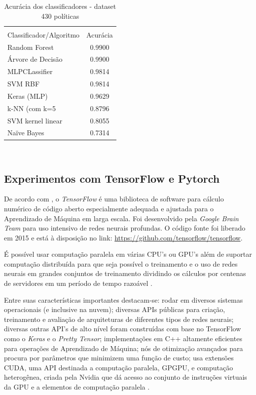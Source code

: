 \begin{table}[h]
	\centering
	\caption{Acurácia dos classificadores - dataset 430 políticas}
	\label{tab:acuracias2}
	\vspace{0.3cm}
	\begin{tabular}{p{6cm}c}
		\hline\\
		Classificador/Algoritmo& Acurácia  \\[10pt] 
		\hline
		Random Forest~		   & 0.9900    \\
		Árvore de Decisão      & 0.9900    \\
		MLPCLassifier~		   & 0.9814   \\
		SVM RBF                & 0.9814    \\
		Keras (MLP)            & 0.9629    \\
		k-NN (com k=5          & 0.8796    \\
		SVM kernel linear~	   & 0.8055    \\
		Naïve Bayes~		   & 0.7314    \\		
		\hline
	\end{tabular}
	\\[6pt]		
\end{table}

\subsection{Experimentos com TensorFlow e Pytorch}\label{exp:tensorflow-pytorch}
De acordo com , o \textit{TensorFlow} é uma biblioteca de software para cálculo numérico de código aberto especialmente adequada e ajustada para o Aprendizado de Máquina em larga escala. Foi desenvolvido pela \textit{Google Brain Team} para uso intensivo de redes neurais profundas. O código fonte foi liberado em 2015 e está à disposição no link: \hyperlink{https://github.com/tensorflow/tensorflow}{https://github.com/tensorflow/tensorflow}.

É possível usar computação paralela em várias CPU's ou GPU's além de suportar computação distribuída para que seja possível o treinamento e o uso de redes neurais em grandes conjuntos de treinamento dividindo os cálculos por centenas de servidores em um período de tempo razoável \cite{geron_maos_2020}. 

Entre suas características importantes destacam-se: rodar em diversos sistemas operacionais (e inclusive na nuvem); diversas APIs públicas para criação, treinamento e avaliação de arquiteturas de diferentes tipos de redes neurais; diversas outras API's de alto nível foram construídas com base no TensorFlow como o \textit{Keras} e o \textit{Pretty Tensor}; implementações em C++ altamente eficientes para operações de Aprendizado de Máquina; nós de otimização avançados para procura por parâmetros que minimizem uma função de custo; usa extensões CUDA, uma  API destinada a computação paralela, GPGPU, e computação heterogênea, criada pela Nvidia que dá acesso ao conjunto de instruções virtuais da GPU e a elementos de computação paralela \cite{geron_maos_2020}.


